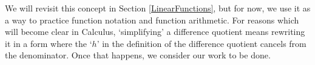\smallskip

We will revisit this concept in Section \ref{LinearFunctions}, but for now, we use it as a way to practice function notation and function arithmetic.  For reasons which will become clear in Calculus,  `simplifying' a difference quotient means rewriting it in a form where the `$h$' in the definition of the difference quotient cancels from the denominator. Once that happens, we consider our work to be done.

\pagebreak

